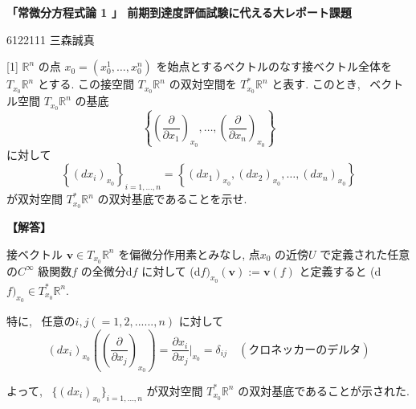 \documentclass{jsarticle}
\begin{document}
\textbf{「常微分方程式論 1 」 前期到達度評価試験に代える大レポート課題}

\begin{flushright}
6122111 三森誠真
\end{flushright}

\begin{itembox}[l]{[1]}
$\mathbb{R}^n$ の点 $x_0 = (x_0^1, \dots, x_0^n)$ を始点とするベクトルのなす接ベクトル全体を $T_{x_0}\mathbb{R}^n$ とする. この接空間 $T_{x_0}\mathbb{R}^n$ の双対空間を $T_{x_0}^* \mathbb{R}^n$ と表す. このとき, \ ベクトル空間 $T_{x_0}\mathbb{R}^n$ の基底
\[
\left\{ \left( \frac{\partial}{\partial x_1} \right)_{x_0}, \dots, \left( \frac{\partial}{\partial x_n} \right)_{x_0} \right\}
\]
に対して
\[
\left\{ (dx_i)_{x_0} \right\}_{i=1,\dots,n} = \left\{ (dx_1)_{x_0}, (dx_2)_{x_0}, \dots, (dx_n)_{x_0} \right\}
\]
が双対空間 $T_{x_0}^* \mathbb{R}^n$ の双対基底であることを示せ.
  
\end{itembox}

\noindent
\textbf{【解答】}

接ベクトル \(\bm{v} \in T_{x_0} \mathbb{R}^n\) を偏微分作用素とみなし, 点$x_0$ の近傍$U$ で定義された任意の$C^{\infty}$ 級関数$f$ の全微分d$f$ に対して
(d$f)_{x_0} (\bm{v}) := \bm{v} (f)$ と定義すると (d$f)_{x_0} \in T_{x_0}^* \mathbb{R}^n$.

特に, \ 任意の$i, j (=1, 2, ......, n)$ に対して
\[
(dx_i)_{x_0} \left( \left( \frac{\partial}{\partial x_j} \right)_{x_0} \right) = \frac{\partial x_i}{\partial x_j} \bigg|_{x_0}
= \delta_{ij} \quad (クロネッカーのデルタ)
\]

よって, \ \(\{ (dx_i)_{x_0} \}_{i=1, \ldots, n}\) が双対空間 \(T_{x_0}^* \mathbb{R}^n\) の双対基底であることが示された.
\end{document}
